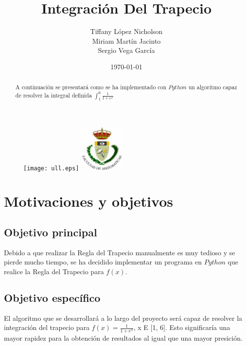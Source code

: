 \documentclass{article}
\begin{document}
  \begin{figure}[t]
    \begin{center}
        \texttt{[image: ull.eps]}
        \hspace{5.5cm}
		\includegraphics[width=0.2\textwidth]{fmatesc.eps}
    \end{center}
  \end{figure}
  \title{Integración Del Trapecio}
  \author{Tiffany López Nicholson \\ Miriam Martín Jacinto \\ Sergio Vega García}
  \date{\today}
  \maketitle

  \begin{abstract}
    \begin{center}
       A continuación se presentará como se ha implementado con $Python$ un algoritmo capaz de resolver la integral definida $\int_{1}^{6} \frac{1}{1+e^x}$
    \end{center}
  \end{abstract}
  \pagebreak


  \tableofcontents
  \pagebreak
  
  
  \section{Motivaciones y objetivos}
    \subsection{Objetivo principal}
       Debido a que realizar la Regla del Trapecio manualmente es muy tedioso y se pierde mucho tiempo, se ha decidido implementar un programa en $Python$ que realice la Regla del Trapecio para $f(x)$.
    \subsection{Objetivo específico} 
       El algoritmo que se desarrollará a lo largo del proyecto será capaz de resolver la integración del trapecio para $ f(x) = \frac{1}{1 + e^{x}}$, x E [1, 6]. Esto significaría una mayor rapidez para la obtención de resultados al igual que una mayor presición.
  \pagebreak
\end{document}
